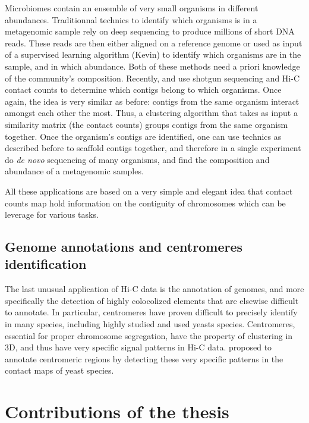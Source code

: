 Microbiomes contain an ensemble of very small organisms in different
abundances. Traditionnal technics to identify which organisms is in a
metagenomic sample rely on deep sequencing to produce millions of short DNA
reads. These reads are then either aligned on a reference genome or used as
input of a supervised learning algorithm (Kevin) to identify which organisms
are in the sample, and in which abundance. Both of these
methods need a priori knowledge of the community's composition. Recently,
\citet{burton:species-level} and \citet{marbouty:metagenomic} use shotgun
sequencing and Hi-C contact counts to determine which contigs belong to which
organisms. Once again, the idea is very similar as before: contigs from the
same organism interact amongst each other the most. Thus, a clustering
algorithm that takes as input a similarity matrix (the contact counts) groups
contigs from the same organism together. Once the organism's contigs are
identified, one can use technics as described before to scaffold contigs
together, and therefore in a single experiment do \textit{de novo} sequencing
of many organisms, and find the composition and abundance of a metagenomic
samples.

All these applications are based on a very simple and elegant idea that
contact counts map hold information on the contiguity of chromosomes which can
be leverage for various tasks.

\subsection{Genome annotations and centromeres identification}

The last unusual application of Hi-C data is the annotation of genomes, and
more specifically the detection of highly colocolized elements that are
elsewise difficult to annotate. In particular, centromeres have proven
difficult to precisely identify in many species, including highly studied and
used yeasts species. Centromeres, essential for proper chromosome segregation,
have the property of clustering in 3D, and thus have very specific signal
patterns in Hi-C data. \citet{marie-nelly:filling} proposed to annotate
centromeric regions by detecting these very specific patterns in the contact
maps of yeast species.

\section{Contributions of the thesis}

